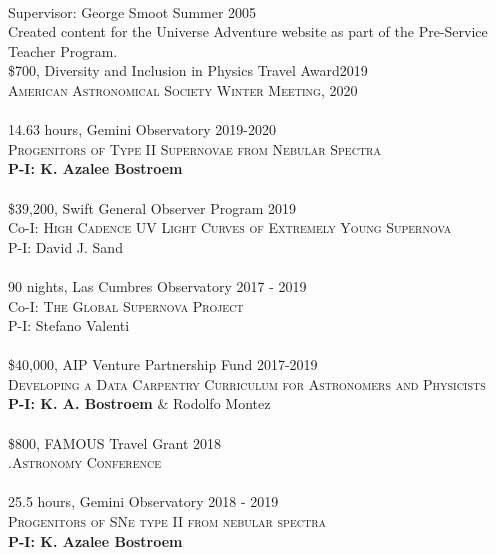 \documentclass[10pt]{cv}
\begin{document}
\begin{llist}
\\
Supervisor: George Smoot \hfill Summer 2005\\
Created content for the Universe Adventure website as part of the 
Pre-Service Teacher Program.\\
\vspace{-0.1in}   
\$700, Diversity and Inclusion in Physics Travel Award\hfill 2019\\
\textsc{American Astronomical Society Winter Meeting, 2020}\\
\\
14.63 hours, Gemini Observatory \hfill 2019-2020\\
\textsc{Progenitors of Type II Supernovae from Nebular Spectra}\\
\textbf{P-I: K. Azalee Bostroem}\\
\\
\$39,200, Swift General Observer Program \hfill 2019\\
Co-I: \textsc{High Cadence UV Light Curves of Extremely Young Supernova}\\
P-I: David J. Sand\\
\\
90 nights, Las Cumbres Observatory \hfill 2017 - 2019\\
Co-I: \textsc{The Global Supernova Project}\\
P-I: Stefano Valenti \\
\\
\$40,000, AIP Venture Partnership Fund \hfill 2017-2019\\
\textsc{Developing a Data Carpentry Curriculum for Astronomers and Physicists}\\
{\bf P-I: K. A. Bostroem} \& Rodolfo Montez\\
\\
\$800, FAMOUS Travel Grant \hfill2018\\ 
\textsc{.Astronomy Conference}\\
\\
25.5 hours, Gemini Observatory \hfill 2018 - 2019\\
\textsc{Progenitors of SNe type II from nebular spectra}\\
{\bf P-I: K. Azalee Bostroem} \\
\\

\end{llist}
\end{document}
